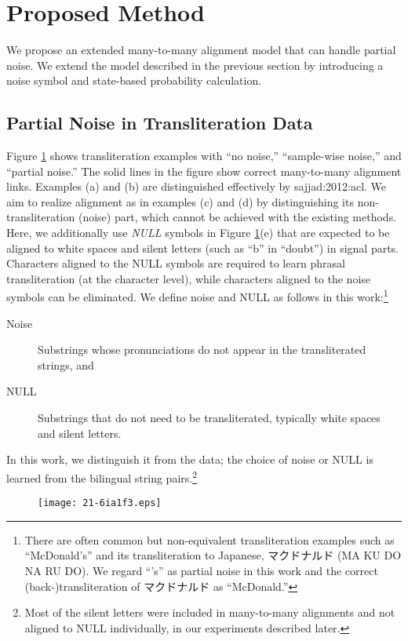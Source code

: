 \documentclass[english]{jnlp_1.4}
\newcommand{\newcite}{}
\begin{document}
\section{Proposed Method}

We propose an extended many-to-many alignment model that can handle partial noise.
We extend the model described in the previous section by introducing a noise symbol
and state-based probability calculation.


\subsection{Partial Noise in Transliteration Data}

Figure \ref{fig:partial-noise} shows transliteration examples with ``no noise,'' ``sample-wise noise,'' and ``partial noise.''
The solid lines in the figure show correct many-to-many alignment links.
Examples (a) and (b) are distinguished effectively by \newcite{sajjad:2012:acl}.
We aim to realize alignment as in examples (c) and (d) by distinguishing its non-transliteration (noise) part,
which cannot be achieved with the existing methods.
Here, we additionally use {\it NULL} symbols in Figure {\ref{fig:partial-noise}}(e)
that are expected to be aligned to white spaces and silent letters (such as ``b'' in ``doubt'') in signal parts.
Characters aligned to the NULL symbols are required to learn phrasal transliteration (at the character level),
while characters aligned to the noise symbols can be eliminated.
We define noise and NULL as follows in this work:\footnote{
There are often common but non-equivalent transliteration examples such as ``McDonald's''
and its transliteration to Japanese, マクドナルド (MA KU DO NA RU DO).
We regard ``'s'' as partial noise in this work and the correct (back-)transliteration of マクドナルド as ``McDonald.''}
\begin{description}
\item[Noise] Substrings whose pronunciations do not appear in the transliterated strings, and
\item[NULL]  Substrings that do not need to be transliterated, typically white spaces and silent letters.
\end{description}
In this work, we distinguish it from the data; the choice of noise or NULL is learned from the bilingual string pairs.\footnote{
Most of the silent letters were included in many-to-many alignments and not aligned to NULL individually,
in our experiments described later.}

\begin{figure}[t]
\begin{center}
\texttt{[image: 21-6ia1f3.eps]}
\end{center}
\label{fig:partial-noise}
\vspace{-0.5\Cvs}
\end{figure}
\end{document}

